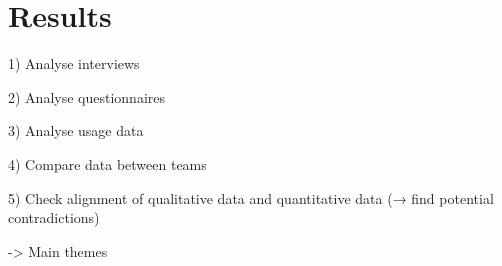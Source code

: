 \chapter{Results}

1) Analyse interviews

2) Analyse questionnaires

3) Analyse usage data

4) Compare data between teams

5) Check alignment of qualitative data and quantitative data (→ find potential contradictions)


-> Main themes